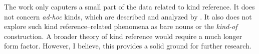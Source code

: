 \documentclass[a4paper, 12pt]{article}
\begin{document}
The work only caputers a small part of the data related to kind reference. It does not concern \textit{ad-hoc} kinds, which are described and analyzed by \textcite{mendia2019referenceadhoc}. It also does not explore such kind reference--related phenomena as bare nouns or the \textit{kind-of} construction. A broader theory of kind reference would require a much longer form factor. However, I believe, this provides a solid ground for further research.

\pagebreak
\printbibliography
\end{document}
